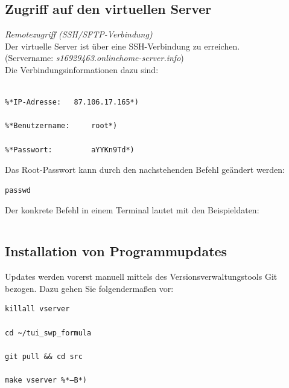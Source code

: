 \documentclass[fontsize = 12pt, paper = a4]{scrreprt}
\begin{document}
\subsection{Zugriff auf den virtuellen Server}		

\textit{Remotezugriff (SSH/SFTP-Verbindung)} \\

Der virtuelle Server ist über eine SSH-Verbindung zu erreichen. \\
(Servername: \textit{s16929463.onlinehome-server.info}) \\
Die Verbindungsinformationen dazu sind:

\vspace*{4mm}
\begin{lstlisting}[frame=single]
%*Port:  		22*)

%*IP-Adresse: 	87.106.17.165*) 

%*Benutzername:		root*)

%*Passwort:			aYYKn9Td*)
\end{lstlisting} 
\vspace*{-2mm}

Das Root-Passwort kann durch den nachstehenden Befehl geändert werden:

\vspace*{4mm}
\begin{lstlisting}[frame=single]
passwd
\end{lstlisting} 
\vspace*{-2mm}

\newpage

Der konkrete Befehl in einem Terminal lautet mit den Beispieldaten:	

\vspace*{4mm}
\begin{lstlisting}[frame=single]
%*ssh root@87.106.17.165  –p22*)
\end{lstlisting} 
\vspace*{-2mm}

\subsection{Installation von Programmupdates}

Updates werden vorerst manuell mittels des Versionsverwaltungstools Git bezogen. Dazu gehen Sie folgendermaßen vor:

\vspace*{4mm}
\begin{lstlisting}[frame=single]
killall vserver

cd ~/tui_swp_formula

git pull && cd src

make vserver %*–B*)
\end{lstlisting} 
\vspace*{-2mm}
\end{document}
